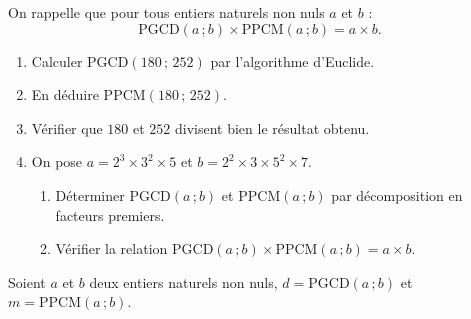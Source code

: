 
On rappelle que pour tous entiers naturels non nuls $a$ et $b$ :
$$
\mathrm{PGCD}(a\,;b) \times \mathrm{PPCM}(a\,;b) = a \times b.
$$

\begin{enumerate}
	\item Calculer $\mathrm{PGCD}(180\,;\,252)$ par l'algorithme d'Euclide.
	\item En déduire $\mathrm{PPCM}(180\,;\,252)$.
	\item Vérifier que $180$ et $252$ divisent bien le résultat obtenu.
	\item On pose $a = 2^3 \times 3^2 \times 5$ et $b = 2^2 \times 3 \times 5^2 \times 7$.
	\begin{enumerate}
		\item Déterminer $\mathrm{PGCD}(a\,;b)$ et $\mathrm{PPCM}(a\,;b)$ par décomposition en facteurs premiers.
		\item Vérifier la relation $\mathrm{PGCD}(a\,;b) \times \mathrm{PPCM}(a\,;b) = a \times b$.
	\end{enumerate}
\end{enumerate}



Soient $a$ et $b$ deux entiers naturels non nuls, $d = \mathrm{PGCD}(a\,;b)$
et $m = \mathrm{PPCM}(a\,;b)$.

%
%


